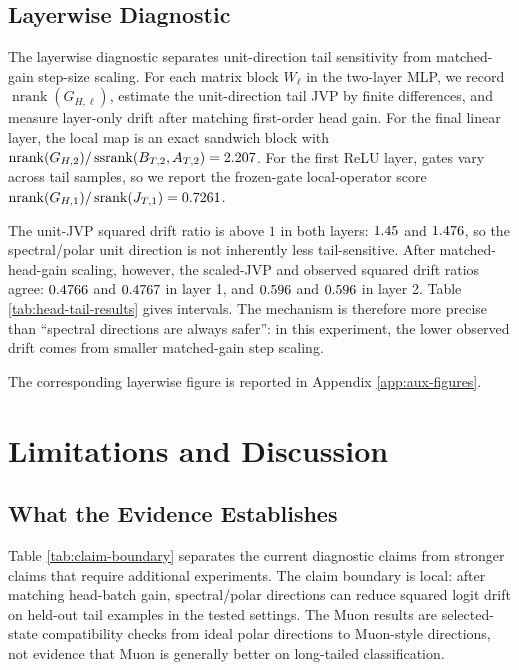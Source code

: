 \documentclass{article}
\theoremstyle{definition}
\newcommand{\srank}{\operatorname{srank}}
\newcommand{\nrank}{\operatorname{nrank}}
\newcommand{\ssrank}{\operatorname{ssrank}}
\begin{document}
\subsection{Layerwise Diagnostic}

The layerwise diagnostic separates unit-direction tail sensitivity from matched-gain step-size scaling. For each matrix block \(W_\ell\) in the two-layer MLP, we record \(\nrank(G_{H,\ell})\), estimate the unit-direction tail JVP by finite differences, and measure layer-only drift after matching first-order head gain. For the final linear layer, the local map is an exact sandwich block with \(\nrank(G_{H,2})/\ssrank(B_{T,2},A_{T,2})=\EelevenLayerTwoTheoremConditionScore\). For the first ReLU layer, gates vary across tail samples, so we report the frozen-gate local-operator score \(\nrank(G_{H,1})/\srank(J_{T,1})=\EelevenLayerOneLocalOperatorConditionScore\).

The unit-JVP squared drift ratio is above \(1\) in both layers: \(1.45\) and \(1.476\), so the spectral/polar unit direction is not inherently less tail-sensitive. After matched-head-gain scaling, however, the scaled-JVP and observed squared drift ratios agree: \(0.4766\) and \(0.4767\) in layer 1, and \(0.596\) and \(0.596\) in layer 2. Table \ref{tab:head-tail-results} gives intervals. The mechanism is therefore more precise than ``spectral directions are always safer'': in this experiment, the lower observed drift comes from smaller matched-gain step scaling.

The corresponding layerwise figure is reported in Appendix \ref{app:aux-figures}.

\section{Limitations and Discussion}

\subsection{What the Evidence Establishes}

Table \ref{tab:claim-boundary} separates the current diagnostic claims from stronger claims that require additional experiments. The claim boundary is local: after matching head-batch gain, spectral/polar directions can reduce squared logit drift on held-out tail examples in the tested settings. The Muon results are selected-state compatibility checks from ideal polar directions to Muon-style directions, not evidence that Muon is generally better on long-tailed classification.
\end{document}
